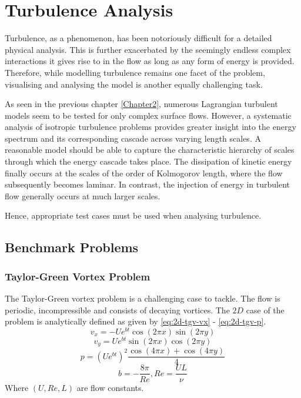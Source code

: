 \chapter{Turbulence Analysis} %
\label{Chapter3}

Turbulence, as a phenomenon, has been notoriously difficult for a detailed physical analysis. This is further exacerbated by the seemingly endless complex interactions it gives rise to in the flow as long as any form of energy is provided.
Therefore, while modelling turbulence remains one facet of the problem, visualising and analysing the model is another equally challenging task.

As seen in the previous chapter \ref{Chapter2}, numerous Lagrangian turbulent models seem to be tested for only complex surface flows. However, a systematic analysis of isotropic turbulence problems provides greater insight into the energy spectrum and its corresponding cascade across varying length scales. A reasonable model should be able to capture the characteristic hierarchy of scales through which the energy cascade takes place. The dissipation of kinetic energy finally occurs at the scales of the order of Kolmogorov length, where the flow subsequently becomes laminar. In contrast, the injection of energy in turbulent flow generally occurs at much larger scales.

Hence, appropriate test cases must be used when analysing turbulence.

\section{Benchmark Problems}
\subsection{Taylor-Green Vortex Problem}
The Taylor-Green vortex problem is a challenging case to tackle. The flow is periodic, incompressible and consists of decaying vortices.
The $2D$ case of the problem is analytically defined as given by \ref{eq:2d-tgv-vx} - \ref{eq:2d-tgv-p}.
\begin{equation}
    v_x = -U e^{bt} \cos(2\pi x) \sin(2\pi y)
    \label{eq:2d-tgv-vx}
\end{equation}
\begin{equation}
    v_y = U e^{bt} \sin(2\pi x) \cos(2\pi y)
    \label{eq:2d-tgv-vy}
\end{equation}
\begin{equation}
    p = (U e^{bt})^2 \frac{\cos(4\pi x) + \cos(4\pi y)}{4}
    \label{eq:2d-tgv-p}
\end{equation}
\begin{equation}
    b = -\frac{8\pi}{Re}, Re = \frac{UL}{\nu}
\end{equation}
Where $(U, Re, L)$ are flow constants.

